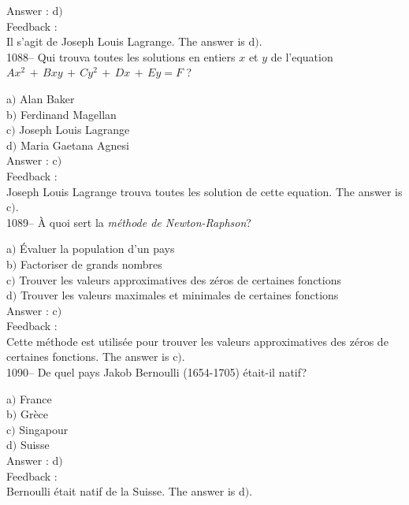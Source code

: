 \documentclass[letterpaper, 12pt]{article}
\begin{document}
Answer : d$)$\\

Feedback : \\
Il s'agit de Joseph Louis Lagrange.
The answer is d$)$.\\

1088-- Qui trouva toutes les solutions en entiers $x$ et $y$ de
l'equation $Ax^2\,+\,Bxy\,+\,Cy^2\,+\,Dx\,+\,Ey=F$ ?

a$)$ Alan Baker \\
b$)$ Ferdinand Magellan \\
c$)$ Joseph Louis Lagrange \\
d$)$ Maria Gaetana Agnesi\\

Answer : c$)$\\

Feedback : \\
Joseph Louis Lagrange trouva toutes les solution de cette
equation.
The answer is c$)$.\\

1089-- \`A quoi sert la {\sl m\'ethode de Newton-Raphson}?

a$)$ \'Evaluer la population d'un pays \\
b$)$ Factoriser de grands nombres \\
c$)$ Trouver les valeurs approximatives des z\'eros de certaines fonctions
\\
d$)$ Trouver les valeurs maximales et minimales de certaines fonctions\\

Answer : c$)$\\

Feedback : \\
Cette m\'ethode est utilis\'ee pour trouver les valeurs
approximatives des z\'eros de certaines fonctions. The answer is
c$)$.\\

1090-- De quel pays Jakob Bernoulli (1654-1705) \'etait-il natif?

a$)$ France  \\
b$)$ Gr\`ece  \\
c$)$ Singapour \\
d$)$ Suisse\\

Answer : d$)$\\

Feedback : \\
Bernoulli \'etait natif de la Suisse.
The answer is d$)$.\\
\end{document}
